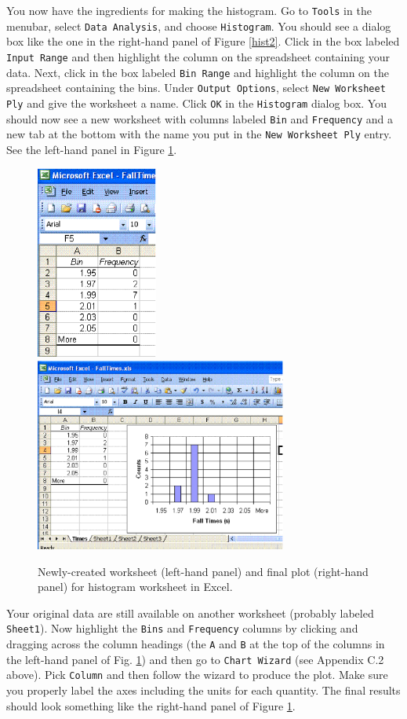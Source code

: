 You now have the ingredients for making the histogram.
Go to {\tt Tools} in the menubar, select {\tt Data Analysis}, and choose {\tt Histogram}.
You should see a dialog box like the one in the right-hand panel of  Figure \ref{hist2}.
Click in the box labeled {\tt Input Range} and then highlight the column on the spreadsheet containing your data.
Next, click in the box labeled {\tt Bin Range} and highlight the column on the spreadsheet containing the bins.
Under {\tt Output Options}, select {\tt New Worksheet Ply} and give the worksheet a name.
Click {\tt OK} in the {\tt Histogram} dialog box.
You should now see a new worksheet with columns labeled {\tt Bin} and {\tt Frequency} and a new tab at the bottom with the name you put in
the {\tt New Worksheet Ply} entry.
See the left-hand panel in Figure \ref{hist5}.
\begin{figure}[h!]
\begin{center}
\includegraphics[height=2.5in]{histogram_plots/histf4.eps}\hspace{0.4in}\includegraphics[height=2.5in]{histogram_plots/histf5.eps}
\caption{Newly-created worksheet (left-hand panel) and final plot (right-hand panel) for  histogram worksheet in Excel.}\label{hist5}
\end{center}
\end{figure}
Your original data are still available on another worksheet (probably labeled {\tt Sheet1}).
Now highlight the {\tt Bins} and {\tt Frequency} columns by clicking and dragging across the column headings (the {\tt A} and {\tt B}
at the top of the columns in the left-hand panel of Fig. \ref{hist5}) and then go to {\tt Chart Wizard} (see Appendix C.2 above).
Pick {\tt Column} and then follow the wizard to produce the plot. 
Make sure you properly label the axes including the units for each quantity.
The final results should look something like the right-hand panel of Figure \ref{hist5}.
